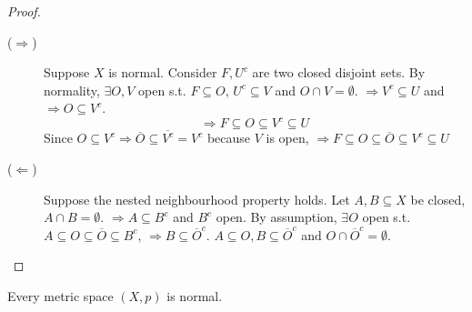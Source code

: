 \begin{proof} \leavevmode
    \begin{description}
        \item[($\Rightarrow$)] Suppose $X$ is normal. Consider $F, U^c$ are two closed disjoint sets. 
        By normality, $\exists O, V$ open s.t. $F \subseteq O$, $U^c \subseteq V$ and 
        $O \cap V = \emptyset$. $\Rightarrow V^c \subseteq U$ and $\Rightarrow O \subseteq V^c$.
        \[
            \Rightarrow F \subseteq O \subseteq V^c \subseteq U
        \]   
        Since $O \subseteq V^c \Rightarrow \overline{O} \subseteq \overline{V^c} = V^c$ 
        because $V$ is open, $\Rightarrow F \subseteq O \subseteq \overline{O} \subseteq V^c \subseteq U$
        \item[($\Leftarrow$)] Suppose the nested neighbourhood property holds. Let $A, B \subseteq X$ be
        closed, $A \cap B = \emptyset$.  $\Rightarrow A \subseteq B^c$ and $B^c$ open.
        By assumption, $\exists O$ open s.t. $A \subseteq O \subseteq \overline{O} \subseteq B^c$,
        $\Rightarrow B \subseteq \overline{O}^c$. $A \subseteq O, B \subseteq \overline{O}^c$ and
        $O \cap \overline{O}^c = \emptyset$. \qedhere
    \end{description}
\end{proof}

\begin{cor}
    Every metric space $(X, p)$ is normal. 
\end{cor}

